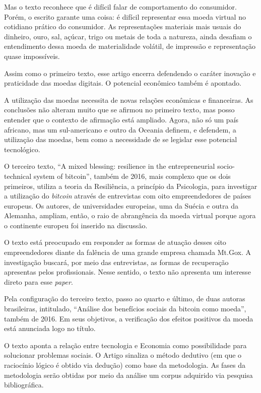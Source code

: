 \documentclass[12pt]{article}
\begin{document}
Mas o texto reconhece que é difícil falar de comportamento do consumidor. Porém, o escrito garante uma coisa: é difícil representar essa moeda virtual no cotidiano prático do consumidor. As representações materiais mais usuais do dinheiro, ouro, sal, açúcar, trigo ou metais de toda a natureza, ainda desafiam o entendimento dessa moeda de materialidade volátil, de impressão e representação quase impossíveis.

Assim como o primeiro texto, esse artigo encerra defendendo o caráter inovação e praticidade das moedas digitais. O potencial econômico também é apontado.

A utilização das moedas necessita de novas relações econômicas e financeiras. As conclusões não alteram muito que se afirmou no primeiro texto, mas posso entender que o contexto de afirmação está ampliado. Agora, não só um país africano, mas um sul-americano e outro da Oceania definem, e defendem, a utilização das moedas, bem como a necessidade de se legislar esse potencial tecnológico.

O terceiro texto, “A mixed blessing: resilience in the entrepreneurial socio-technical system of bitcoin”, também de 2016, mais complexo que os dois primeiros, utiliza a teoria da Resiliência, a princípio da Psicologia, para investigar a utilização do \textit{bitcoin} através de entrevistas com oito empreendedores de países europeus. Os autores, de universidades europeias, uma da Suécia e outra da Alemanha, ampliam, então, o raio de abrangência da moeda virtual porque agora o continente europeu foi inserido na discussão.

O texto está preocupado em responder as formas de atuação desses oito empreendedores diante da falência de uma grande empresa chamada Mt.Gox. A investigação buscará, por meio das entrevistas, as formas de recuperação apresentas pelos profissionais. Nesse sentido, o texto não apresenta um interesse direto para esse \textit{paper}.

Pela configuração do terceiro texto, passo ao quarto e último, de duas autoras brasileiras, intitulado, “Análise dos benefícios sociais da bitcoin como moeda”, também de 2016. Em seus objetivos, a verificação dos efeitos positivos da moeda está anunciada logo no título.

O texto aponta a relação entre tecnologia e Economia como possibilidade para solucionar problemas sociais. O Artigo sinaliza o método dedutivo (em que o raciocínio lógico é obtido via dedução) como base da metodologia. As fases da metodologia serão obtidas por meio da análise um corpus adquirido via pesquisa bibliográfica.
\end{document}
